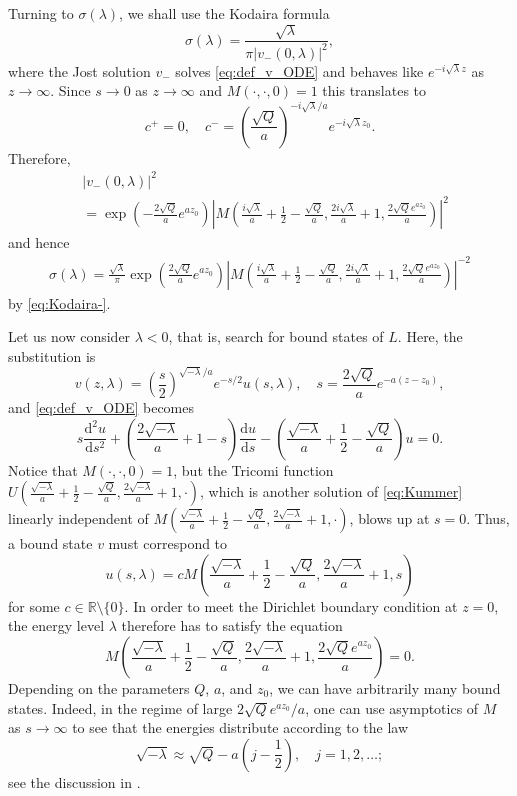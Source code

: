 \documentclass[11pt,twoside,reqno,centertags]{amsart}
\theoremstyle{definition}
\newcommand{\R}{\mathbb R}
\newcommand{\dd}{\mathrm d}
\begin{document}
Turning to $\sigma(\lambda)$, we shall use the Kodaira formula \cite[p. 940]{Kodaira49}
\begin{equation}\label{eq:Kodaira-}
	\sigma(\lambda)=\frac{\sqrt\lambda}{\pi|v_-(0,\lambda)|^2},
\end{equation}
where the Jost solution $v_-$ solves \eqref{eq:def_v_ODE} and behaves like $e^{-i\sqrt\lambda z}$ as $z\to\infty$. Since $s\to 0$ as $z\to\infty$ and $M(\cdot,\cdot,0)=1$ this translates to
\[c^+=0,\quad c^-=\left(\frac{\sqrt Q}{a}\right)^{-i\sqrt\lambda/a} e^{-i\sqrt\lambda z_0}.\]
Therefore,
\begin{align*}
	&|v_-(0,\lambda)|^2 \\
	&= \exp\left(-\frac{2\sqrt Q}{a} e^{az_0}\right) \left| M\left(\frac{i\sqrt{\lambda}}{a} + \frac12 - \frac{\sqrt Q}{a}, \frac{2i\sqrt{\lambda}}{a} + 1, \frac{2\sqrt Q e^{az_0}}{a}\right) \right|^2
\end{align*}
and hence
\begin{align*}
	\sigma(\lambda) = \frac{\sqrt\lambda}{\pi} \exp\left(\frac{2\sqrt Q}{a} e^{az_0}\right) \left| M\left(\frac{i\sqrt{\lambda}}{a} + \frac12 - \frac{\sqrt Q}{a}, \frac{2i\sqrt{\lambda}}{a} + 1, \frac{2\sqrt Q e^{az_0}}{a}\right) \right|^{-2}
\end{align*}
by \eqref{eq:Kodaira-}.

Let us now consider $\lambda<0$, that is, search for bound states of $L$. Here, the substitution is
\[v(z,\lambda) = \left(\frac{s}{2}\right)^{\sqrt{-\lambda}/a} e^{-s/2} u(s,\lambda), \quad s = \frac{2\sqrt Q}{a} e^{-a(z-z_0)},\]
and \eqref{eq:def_v_ODE} becomes
\begin{equation}\label{eq:Kummer}
	s\frac{\dd^2 u}{\dd s^2} + \left(\frac{2\sqrt{-\lambda}}{a} + 1 - s\right) \frac{\dd u}{\dd s} - \left(\frac{\sqrt{-\lambda}}{a} + \frac12 - \frac{\sqrt Q}{a}\right) u = 0.
\end{equation}
Notice that $M(\cdot,\cdot,0)=1$, but the Tricomi function $U(\frac{\sqrt{-\lambda}}{a} + \frac12 - \frac{\sqrt Q}{a}, \frac{2\sqrt{-\lambda}}{a} + 1,\cdot)$, which is another solution of \eqref{eq:Kummer} linearly independent of $M(\frac{\sqrt{-\lambda}}{a} + \frac12 - \frac{\sqrt Q}{a}, \frac{2\sqrt{-\lambda}}{a} + 1,\cdot)$, blows up at $s=0$. Thus, a bound state $v$ must correspond to
\[u(s,\lambda) = c M\left(\frac{\sqrt{-\lambda}}{a} + \frac12 - \frac{\sqrt Q}{a}, \frac{2\sqrt{-\lambda}}{a} + 1, s\right)\]
for some $c\in\R\setminus\{0\}$. In order to meet the Dirichlet boundary condition at $z=0$, the energy level $\lambda$ therefore has to satisfy the equation
\begin{equation}\label{eq:eigenvalue}
	M\left(\frac{\sqrt{-\lambda}}{a} + \frac12 - \frac{\sqrt Q}{a}, \frac{2\sqrt{-\lambda}}{a} + 1, \frac{2\sqrt Q e^{az_0}}{a}\right) = 0.
\end{equation}
Depending on the parameters $Q$, $a$, and $z_0$, we can have arbitrarily many bound states. Indeed, in the regime of large $2\sqrt Q e^{az_0}/a$, one can use asymptotics of $M$ as $s\to\infty$ to see that the energies distribute according to the law
\[\sqrt{-\lambda} \approx \sqrt Q - a\left(j-\frac12\right),\quad j=1,2,\ldots;\]
see the discussion in \cite{terHaar46}.
\end{document}
